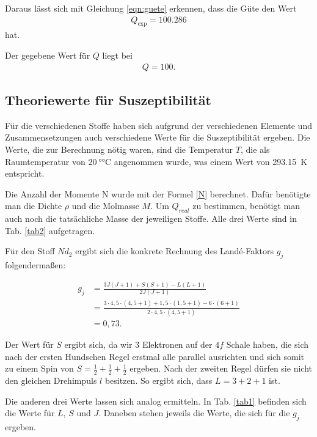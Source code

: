 \noindent Daraus lässt sich mit Gleichung \eqref{eqn:guete} erkennen, dass die Güte den Wert 
\begin{align*} 
    Q_\text{exp} = \num{100.286}
\end{align*}
hat. 

\noindent Der gegebene Wert für $Q$ liegt bei 
\begin{align*} 
    Q = \num{100}.
\end{align*}


\subsection{Theoriewerte für Suszeptibilität} 
Für die verschiedenen Stoffe haben sich aufgrund der verschiedenen Elemente und Zusammensetzungen auch verschiedene 
Werte für die Suszeptibilität ergeben. 
Die Werte, die zur Berechnung nötig waren, sind die Temperatur $T$, die als Raumtemperatur von $\SI{20}{\degree\celsius}$ angenommen wurde, was einem Wert von \SI{293.15}{\kelvin} entspricht. 

\noindent Die Anzahl der Momente N wurde mit der Formel \eqref{N} berechnet. Dafür benötigte man die Dichte $\rho$ und die Molmasse $M$. Um $Q_{real}$ zu bestimmen, benötigt man auch noch die tatsächliche Masse der jeweiligen Stoffe. Alle drei Werte sind in Tab. \ref{tab2} aufgetragen. 



\noindent Für den Stoff $Nd_2$ ergibt sich die konkrete Rechnung des Landé-Faktors $g_j$ folgendermaßen: 

\begin{align*}
    g_j &= \frac{3 J (J+1) + S (S+1) - L (L+1)}{2 J (J+1)} \\
        &= \frac{3 \cdot 4,5 \cdot(4,5 + 1) + 1,5 \cdot (1,5 +1) - 6 \cdot (6+1)}{2 \cdot 4,5 \cdot (4,5 + 1)} \\
        &= 0,73.
\end{align*} 

\noindent Der Wert für $S$ ergibt sich, da wir \num{3} Elektronen auf der $4f$ Schale haben, die sich nach der ersten Hundschen Regel erstmal alle parallel ausrichten und sich somit zu einem Spin von $S = \frac{1}{2}+ \frac{1}{2} + \frac{1}{2}$ ergeben. Nach der zweiten Regel dürfen sie nicht den gleichen Drehimpuls $l$ besitzen. So ergibt sich, dass $L = 3 + 2 + 1$ ist. 

\noindent Die anderen drei Werte lassen sich analog ermitteln. 
In Tab. \ref{tab1} befinden sich die Werte für $L$, $S$ und $J$. Daneben stehen jeweils die Werte, die sich für 
die $g_j$ ergeben. 

